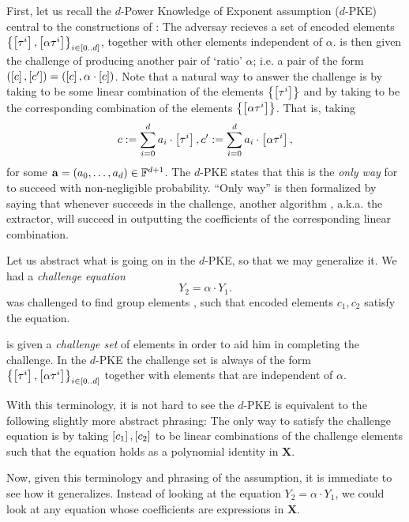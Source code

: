 \documentclass[11pt]{article}
\numberwithin{figure}{section} %
\renewcommand{\a}{\ensuremath{\mathbf{a}}\xspace}
\newcommand{\X}{\ensuremath{\mathbf{X}}\xspace}
\newcommand{\set}[1]{\ensuremath{\left\{#1\right\}}\xspace}
\newcommand{\poly}{\ensuremath{\mathrm{poly}(\lambda)}\xspace}
\begin{document}
First, let us recall the $d$-Power Knowledge of Exponent assumption ($d$-PKE) central to the constructions of \cite{GGPR,PHGR}:
The adversay \adv recieves a set of encoded elements $\sett{\enc{\tau^i},\enc{\alpha \tau^i}}{i\in [0..d]}$,
together with other elements independent of $\alpha$.
\adv is then given the challenge of producing another pair of `ratio' $\alpha$; i.e. a pair of the form $(\left[c\right],\left[c'\right])= (\left[c\right],\alpha\cdot \left[c\right])$.
Note that a natural way to answer the challenge is by taking  to be some linear combination of the elements \set{\enc{\tau^i}} and by taking  to be the corresponding combination
of the elements \set{\enc{\alpha\tau^i}}.
That is, taking
\[c:= \sum_{i=0}^d a_i \cdot \left[\tau^i\right],c':= \sum_{i=0}^d a_i \cdot \left[\alpha\tau^i\right],\]
for some $\a=(a_0,\ldots,a_d)\in \F^{d+1}$.
The $d$-PKE states that this is the \emph{only way} for \adv to succeed with non-negligible probability.
``Only way'' is then formalized by saying that whenever \adv succeeds in the challenge, another algorithm \ext, a.k.a. the extractor, will succeed in outputting the coefficients of the corresponding linear combination.

Let us abstract what is going on in the $d$-PKE, so that we may generalize it. 
We had a \emph{challenge equation}
\[Y_2=\alpha\cdot Y_1.\]
\adv was challenged to find group elements , such that encoded elements $c_1,c_2$ satisfy the equation.


\adv is given a \emph{challenge set} of elements in order to aid him in completing the challenge.
In the $d$-PKE the challenge set is always of the form $\sett{\enc{\tau^i},\enc{\alpha \tau^i}}{i\in [0..d]}$ together with elements
that are independent of $\alpha$.

With this terminology, it is not hard to see the $d$-PKE is equivalent to the following slightly more abstract phrasing:
The only way to satisfy the challenge equation is by taking $\left[c_1\right],\left[c_2\right]$ to be linear combinations of the challenge elements such that the equation holds as a polynomial identity in \X.

Now, given this terminology and phrasing of the assumption, it is immediate to see how it generalizes.
Instead of looking at the equation $Y_2=\alpha \cdot Y_1$, we could look at any equation whose coefficients are expressions in \X.
\end{document}
